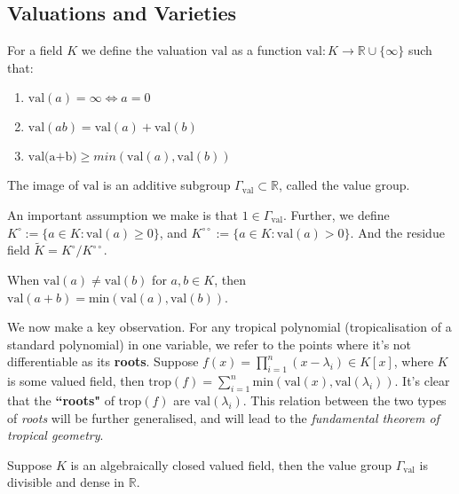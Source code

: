     \subsection{Valuations and Varieties}
    \begin{definition}
        For a field $K$ we define the valuation $\text{val}$ as a function $\text{val}: K \to \mathbb{R}\cup \{\infty\}$ such that:
        \begin{enumerate}
            \item $\text{val}(a) = \infty \Leftrightarrow a = 0$
            \item $\text{val}(ab) = \text{val}(a)+ \text{val}(b)$
            \item $\text{val(a+b)} \geq min(\text{val}(a),\text{val}(b))$
        \end{enumerate}
    The image of $\text{val}$ is an additive subgroup $\Gamma_{\text{val}} \subset \mathbb{R}$, called the value group.
    \end{definition} 
    An important assumption we make is that $1 \in \Gamma_{\text{val}}$. 
    Further, we define $K^{\circ} := \{a \in K: \text{val}(a)\geq 0\}$, and $K^{\circ \circ} := \{a \in K: \text{val}(a)> 0\}$. 
    And the residue field $\tilde{K} = K^{\circ}/K^{\circ \circ}$.
    \begin{lemma}
        \label{vallemma}
        When $\text{val}(a) \neq \text{val}(b)$ for $a,b \in K$, then $\text{val}(a+b)= \text{min}(\text{val}(a),\text{val}(b))$.
    \end{lemma}
    \begin{remark}
        \label{remark1}
    We now make a key observation. For any tropical polynomial (tropicalisation of a standard polynomial) in one variable, we refer to the points where it's not differentiable as its \textbf{roots}. 
    Suppose $f(x) = \prod_{i=1}^{n}(x-\lambda_i) \in K[x]$, where $K$ is some valued field, then $\text{trop}(f) = \sum_{i=1}^{n}\text{min}(\text{val}(x),\text{val}(\lambda_i))$. 
    It's clear that the \textbf{``roots"} of $\text{trop}(f)$ are $\text{val}(\lambda_i)$.
    This relation between the two types of \textit{roots} will be further generalised, and will lead to the \textit{fundamental theorem of tropical geometry}.
    \end{remark}
    \begin{lemma}
        Suppose $K$ is an algebraically closed valued field, then the value group $\Gamma_{\text{val}}$ is divisible and dense in $\mathbb{R}$.
    \end{lemma}
